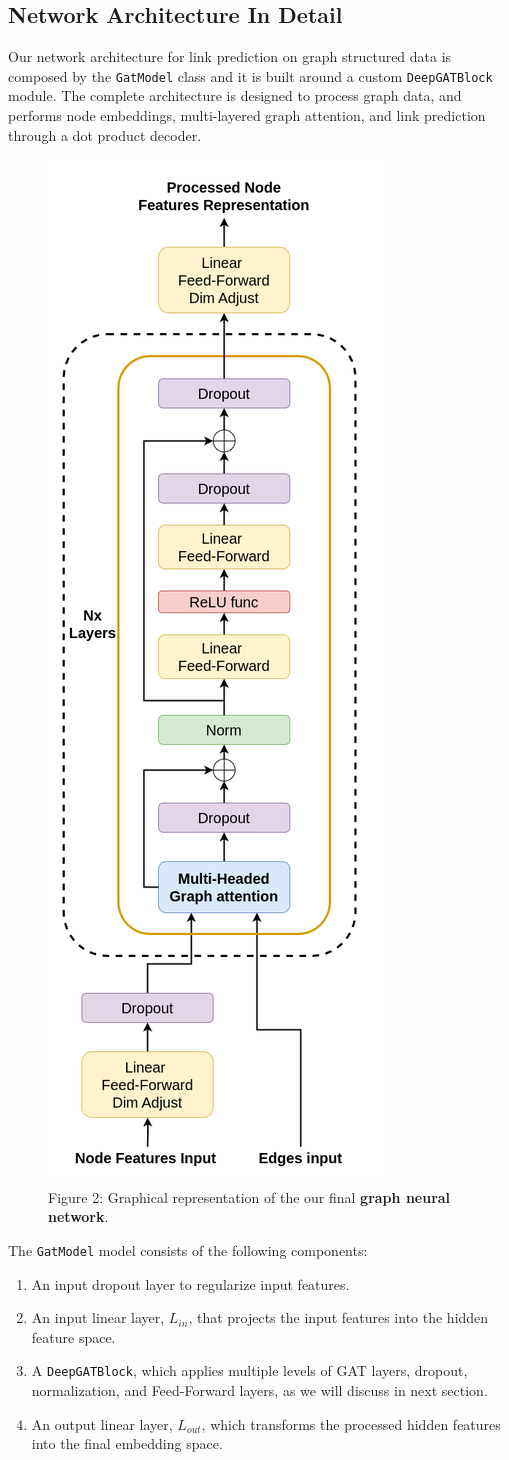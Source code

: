 \documentclass[11pt]{article}
\begin{document}
	\subsection{Network Architecture In Detail}
	Our network architecture for link prediction on graph structured data is composed by the \texttt{GatModel} class and it is built around a custom \texttt{DeepGATBlock} module.
	The complete architecture is designed to process graph data, and performs node embeddings, multi-layered graph attention, and link prediction through a dot product decoder.
	
	\begin{figure}[h] %
		\centering
		\label{figure_2}
		\includegraphics[height=0.8\textwidth]{images/custom_gnn_diagram.png}
		\caption{Figure 2: Graphical representation of the our final \textbf{graph neural network}.}
	\end{figure}
	
	The \texttt{GatModel} model consists of the following components:
	\begin{enumerate}
		\item An input dropout layer to regularize input features.
		
		\item An input linear layer, $L_{in}$, that projects the input features into the hidden feature space.
		
		\item A \texttt{DeepGATBlock}, which applies multiple levels of GAT layers, dropout, normalization, and Feed-Forward layers, as we will discuss in next section.
		
		\item An output linear layer, $L_{out}$, which transforms the processed hidden features into the final embedding space.
	\end{enumerate}
	
\end{document}
